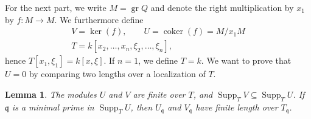 \documentclass[pdflatex,sn-mathphys-num]{sn-jnl}
\numberwithin{equation}{section}
\theoremstyle{thmstyleone}
\newtheorem{lemma}[theorem]{Lemma}
\theoremstyle{thmstyletwo}
\begin{document}
For the next part, we write $M=\operatorname{gr}Q$ and denote the right multiplication by $x_1$ by $f:M\rightarrow M$. We furthermore define
\[
 \begin{gathered}
 V=\ker(f),\qquad U=\operatorname{coker}(f) =M/x_1M\\
 T=k[x_2,\ldots,x_n,\xi_2,\ldots,\xi_n],
 \end{gathered}
\]
hence $T[x_1,\xi_1] = k[x,\xi]$. If $n=1$, we define $T=k$.
We want to prove that $U=0$ by comparing
two lengths over a localization of $T$.


\begin{lemma}\label{lem:tangential-finiteness}
The modules $U$ and $V$ are finite over $T$, and
$\operatorname{Supp}_T V\subseteq\operatorname{Supp}_T U$.
If $\mathfrak q$ is a minimal prime in $\operatorname{Supp}_T U$, then
$U_{\mathfrak q}$ and $V_{\mathfrak q}$ have finite length over
$T_{\mathfrak q}$.
\end{lemma}
\end{document}
